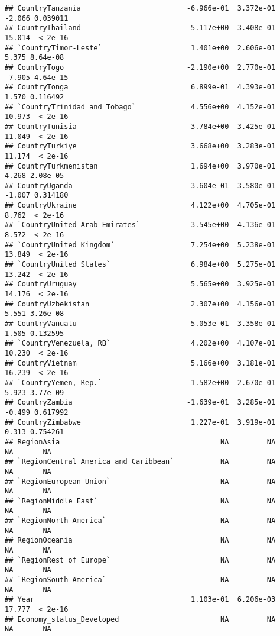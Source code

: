\documentclass[
]{article}
\begin{document}
\begin{verbatim}
## CountryTanzania                         -6.966e-01  3.372e-01  -2.066 0.039011
## CountryThailand                          5.117e+00  3.408e-01  15.014  < 2e-16
## `CountryTimor-Leste`                     1.401e+00  2.606e-01   5.375 8.64e-08
## CountryTogo                             -2.190e+00  2.770e-01  -7.905 4.64e-15
## CountryTonga                             6.899e-01  4.393e-01   1.570 0.116492
## `CountryTrinidad and Tobago`             4.556e+00  4.152e-01  10.973  < 2e-16
## CountryTunisia                           3.784e+00  3.425e-01  11.049  < 2e-16
## CountryTurkiye                           3.668e+00  3.283e-01  11.174  < 2e-16
## CountryTurkmenistan                      1.694e+00  3.970e-01   4.268 2.08e-05
## CountryUganda                           -3.604e-01  3.580e-01  -1.007 0.314180
## CountryUkraine                           4.122e+00  4.705e-01   8.762  < 2e-16
## `CountryUnited Arab Emirates`            3.545e+00  4.136e-01   8.572  < 2e-16
## `CountryUnited Kingdom`                  7.254e+00  5.238e-01  13.849  < 2e-16
## `CountryUnited States`                   6.984e+00  5.275e-01  13.242  < 2e-16
## CountryUruguay                           5.565e+00  3.925e-01  14.176  < 2e-16
## CountryUzbekistan                        2.307e+00  4.156e-01   5.551 3.26e-08
## CountryVanuatu                           5.053e-01  3.358e-01   1.505 0.132595
## `CountryVenezuela, RB`                   4.202e+00  4.107e-01  10.230  < 2e-16
## CountryVietnam                           5.166e+00  3.181e-01  16.239  < 2e-16
## `CountryYemen, Rep.`                     1.582e+00  2.670e-01   5.923 3.77e-09
## CountryZambia                           -1.639e-01  3.285e-01  -0.499 0.617992
## CountryZimbabwe                          1.227e-01  3.919e-01   0.313 0.754261
## RegionAsia                                      NA         NA      NA       NA
## `RegionCentral America and Caribbean`           NA         NA      NA       NA
## `RegionEuropean Union`                          NA         NA      NA       NA
## `RegionMiddle East`                             NA         NA      NA       NA
## `RegionNorth America`                           NA         NA      NA       NA
## RegionOceania                                   NA         NA      NA       NA
## `RegionRest of Europe`                          NA         NA      NA       NA
## `RegionSouth America`                           NA         NA      NA       NA
## Year                                     1.103e-01  6.206e-03  17.777  < 2e-16
## Economy_status_Developed                        NA         NA      NA       NA

\end{verbatim}
\end{document}
